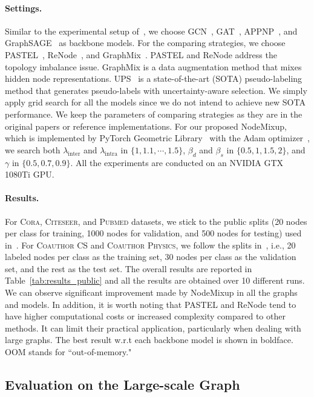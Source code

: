 \documentclass[letterpaper]{article} %
\begin{document}
\paragraph{Settings.}
 Similar to the experimental setup of~\cite{pastel}, we choose GCN~\cite{gcn}, GAT~\cite{gat}, APPNP~\cite{appnp}, and GraphSAGE~\cite{sage} as backbone models. For the comparing strategies, we choose PASTEL~\cite{pastel}, ReNode~\cite{renode}, and GraphMix~\cite{graphmix}. PASTEL and ReNode address the topology imbalance issue. GraphMix is a data augmentation method that mixes hidden node representations. UPS~\cite{ups} is a state-of-the-art (SOTA) pseudo-labeling method that generates pseudo-labels with uncertainty-aware selection. We simply apply grid search for all the models since we do not intend to achieve new SOTA performance. We keep the parameters of comparing strategies as they are in the original papers or reference implementations. For our proposed NodeMixup, which is implemented by PyTorch Geometric Library~\cite{torch_geo} with the Adam optimizer~\cite{adam}, we search both $\lambda_{\text{inter}}$ and $\lambda_{\text{intra}}$ in $\{1, 1.1, \cdots, 1.5\}$, $\beta_{d}$ and $\beta_{s}$ in $\{0.5, 1, 1.5, 2\}$, and $\gamma$ in $\{0.5, 0.7, 0.9\}$. All the experiments are conducted on an NVIDIA GTX 1080Ti GPU. 

\paragraph{Results.}
For \textsc{Cora}, \textsc{Citeseer}, and \textsc{Pubmed} datasets, we stick to the public splits (20 nodes per class for training, 1000 nodes for validation, and 500 nodes for testing) used in~\cite{cora}. For \textsc{Coauthor CS} and \textsc{Coauthor Physics}, we follow the splits in~\cite{coauthor}, i.e., 20 labeled nodes per class as the training set, 30 nodes per class as the validation set, and the rest as the test set. The overall results are reported in Table~\ref{tab:results_public} and all the results are obtained over 10 different runs. We can observe significant improvement made by NodeMixup in all the graphs and models. In addition, it is worth noting that PASTEL and ReNode tend to have higher computational costs or increased complexity compared to other methods. It can limit their practical application, particularly when dealing with large graphs. The best result w.r.t each backbone model is shown in boldface. OOM stands for ``out-of-memory."

\subsection{Evaluation on the Large-scale Graph}
\end{document}
